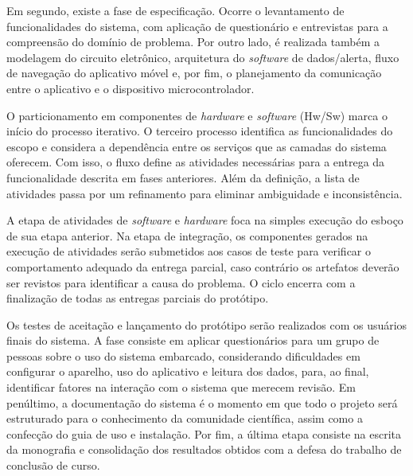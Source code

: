 Em segundo, existe a fase de especificação. Ocorre o levantamento de funcionalidades do sistema, com aplicação de questionário 
e entrevistas para a compreensão do domínio de problema. Por outro lado, é realizada também a modelagem do circuito 
eletrônico, arquitetura do \textit{software} de dados/alerta, fluxo de navegação do aplicativo móvel e, por fim, o 
planejamento da comunicação entre o aplicativo e o dispositivo microcontrolador.

O particionamento em componentes de \textit{hardware} e \textit{software} (Hw/Sw) marca o início do processo iterativo. O terceiro 
processo identifica as funcionalidades do escopo e considera a dependência entre os serviços que as camadas do sistema oferecem. Com isso, 
o fluxo define as atividades necessárias para a entrega da funcionalidade descrita em fases anteriores. Além da definição, a lista de atividades passa 
por um refinamento para eliminar ambiguidade e inconsistência.

A etapa de atividades de \textit{software} e \textit{hardware} foca na simples execução do esboço de sua etapa anterior. Na etapa de integração, os componentes gerados na execução de atividades 
serão submetidos aos casos de teste para verificar o comportamento adequado da entrega parcial, caso contrário os artefatos 
deverão ser revistos para identificar a causa do problema. O ciclo encerra com a finalização de todas as entregas parciais do protótipo.

Os testes de aceitação e lançamento do protótipo serão realizados com os usuários finais do sistema. A fase consiste em aplicar questionários para um grupo de pessoas sobre o uso 
do sistema embarcado, considerando dificuldades em configurar o aparelho, uso do aplicativo e leitura dos dados, para, ao final, identificar fatores na interação com o sistema que 
merecem revisão. Em penúltimo, a documentação do sistema é o momento em que todo o projeto será estruturado para o conhecimento da comunidade científica, assim como a confecção do guia 
de uso e instalação. Por fim, a última etapa consiste na escrita da monografia e consolidação dos resultados obtidos com a defesa do trabalho de conclusão de curso.
